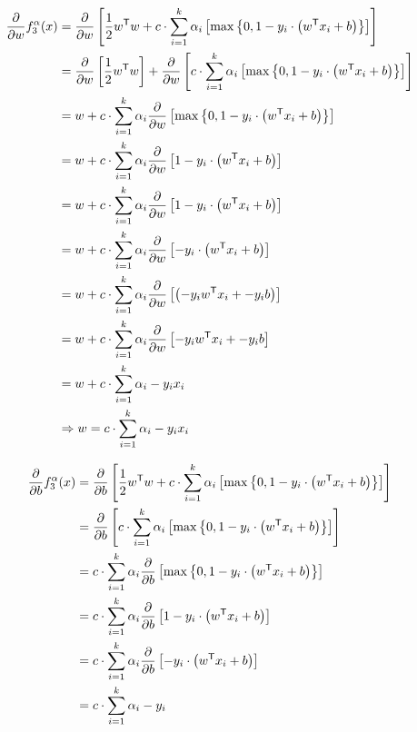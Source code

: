 \documentclass[12pt,landscape]{article}
\newcommand{\tr}{^\mathsf{T}}
\begin{document}
\begin{align}
\frac{\partial}{\partial w} f^{\alpha}_3(x) &= \frac{\partial}{\partial w} \left[  \frac{1}{2} w\tr w +c \cdot \sum\limits_{i=1}^k \alpha_i \left[ \oneLossReg \right] \right]\nonumber\\
&= \frac{\partial}{\partial w} \left[  \frac{1}{2} w\tr w \right] + \frac{\partial}{\partial w} \left[  c \cdot \sum\limits_{i=1}^k \alpha_i \left[\oneLossReg \right] \right]\nonumber\\
&= w +   c \cdot \sum\limits_{i=1}^k \alpha_i \frac{\partial}{\partial w} \left[\oneLossReg \right]\nonumber\\
&= w +   c \cdot \sum\limits_{i=1}^k \alpha_i \frac{\partial}{\partial w} \left[1-y_i \cdot \left( w\tr x_i + b \right) \right]\nonumber\\
&= w +   c \cdot \sum\limits_{i=1}^k \alpha_i \frac{\partial}{\partial w} \left[1-y_i \cdot \left( w\tr x_i + b \right) \right]\nonumber\\
&= w +   c \cdot \sum\limits_{i=1}^k \alpha_i \frac{\partial}{\partial w} \left[-y_i \cdot \left( w\tr x_i + b \right) \right]\nonumber\\
&= w +   c \cdot \sum\limits_{i=1}^k \alpha_i \frac{\partial}{\partial w} \left[\left( -y_i w\tr x_i + -y_i b \right) \right]\nonumber\\
&= w +   c \cdot \sum\limits_{i=1}^k \alpha_i \frac{\partial}{\partial w} \left[ -y_i w\tr x_i + -y_i b \right]\nonumber\\
&= w +   c \cdot \sum\limits_{i=1}^k \alpha_i  -y_i x_i \nonumber\\
&\Rightarrow w =  c \cdot \sum\limits_{i=1}^k \alpha_i  -y_i x_i \label{df1w}
\end{align}

\begin{align*}
\frac{\partial}{\partial b} f^{\alpha}_3(x) &= \frac{\partial}{\partial b} \left[  \frac{1}{2} w\tr w +c \cdot \sum\limits_{i=1}^k \alpha_i \left[ \oneLossReg \right] \right]\\
&= \frac{\partial}{\partial b} \left[  c \cdot \sum\limits_{i=1}^k \alpha_i \left[ \oneLossReg \right] \right]\\
&=   c \cdot \sum\limits_{i=1}^k \alpha_i \frac{\partial}{\partial b} \left[  \oneLossReg \right]\\
&=   c \cdot \sum\limits_{i=1}^k \alpha_i \frac{\partial}{\partial b} \left[  1-y_i \cdot \left( w\tr x_i + b \right) \right]\\
&=   c \cdot \sum\limits_{i=1}^k \alpha_i \frac{\partial}{\partial b} \left[ -y_i \cdot \left( w\tr x_i + b \right) \right]\\
&=   c \cdot \sum\limits_{i=1}^k \alpha_i -y_i\\
\end{align*}
\end{document}

